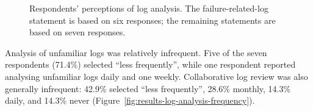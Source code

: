 \begin{figure}[H]
{
    }
    \caption{Respondents' perceptions of log analysis.
    The failure-related-log statement is based on six responses;
    the remaining statements are based on seven responses.}
    \label{fig:results-log-analysis-perceptions}
\end{figure}


Analysis of unfamiliar logs was relatively infrequent. Five of the seven respondents
(71.4\%) selected ``less frequently'', while one respondent reported analysing
unfamiliar logs daily and one weekly. Collaborative log review was also generally
infrequent: 42.9\% selected ``less frequently'', 28.6\% monthly, 14.3\% daily, and
14.3\% never (Figure~\ref{fig:results-log-analysis-frequency}).

